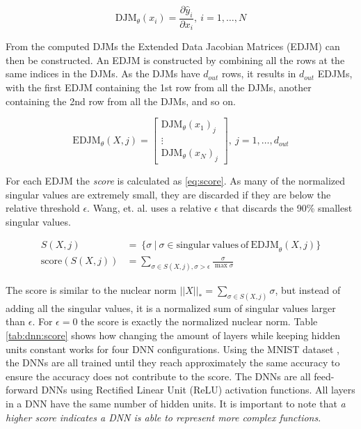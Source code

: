 \begin{equation} \label{eq:wang:djm}
    \mathrm{DJM}_{\theta}(x_i) = \frac{\partial \hat y_i}{\partial x_i},\ i=1, \dots, N
\end{equation}

From the computed DJMs the Extended Data Jacobian Matrices (EDJM) can then be constructed. An EDJM is constructed by combining all the rows at the same indices in the DJMs. As the DJMs have $d_{out}$ rows, it results in $d_{out}$ EDJMs, with the first EDJM containing the 1st row from all the DJMs, another containing the 2nd row from all the DJMs, and so on.

\begin{equation} \label{eq:edjm}
\mathrm{EDJM}_{\theta}(X, j) =
\begin{bmatrix}
\mathrm{DJM}_{\theta}(x_1)_j \\
\vdots \\
\mathrm{DJM}_{\theta}(x_N)_j
\end{bmatrix},\ j=1,\dots,d_{out}
\end{equation}

For each EDJM the \textit{score} is calculated as \eqref{eq:score}. As many of the normalized singular values are extremely small, they are discarded if they are below the relative threshold $\epsilon$. Wang, et. al. uses a relative $\epsilon$ that discards the 90\% smallest singular values.

\begin{equation} \label{eq:score}
  \begin{split}
  S(X, j) &=\ \{\sigma\ |\ \sigma \in \mathrm{singular\ values\ of\ EDJM}_{\theta}(X, j) \} \\  
  \mathrm{score}(S(X, j)) &=  \sum_{\sigma \in S(X, j), \sigma > \epsilon} \frac{\sigma}{\max{\sigma}}  
  \end{split}
\end{equation}

The score is similar to the nuclear norm $||X||_* = \sum_{\sigma \in S(X, j)} \sigma$, but instead of adding all the singular values, it is a normalized sum of singular values larger than $\epsilon$. For $\epsilon=0$ the score is exactly the normalized nuclear norm. Table \ref{tab:dnn:score} shows how changing the amount of layers while keeping hidden units constant works for four DNN configurations. Using the MNIST dataset \cite{lecun:mnist}, the DNNs are all trained until they reach approximately the same accuracy to ensure the accuracy does not contribute to the score. The DNNs are all feed-forward DNNs using Rectified Linear Unit (ReLU) activation functions. All layers in a DNN have the same number of hidden units. It is important to note that \textit{a higher score indicates a DNN is able to represent more complex functions}.

